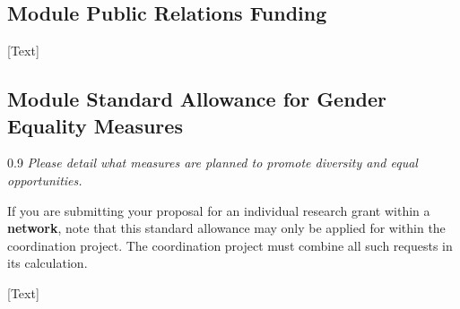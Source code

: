 \documentclass[a4paper,11pt]{article}
\newenvironment{comment}{\begin{spacing}{0.9}\footnotesize\it}{\end{spacing}}
\begin{document}
\subsection{Module Public Relations Funding}

[Text]

\subsection{Module Standard Allowance for Gender Equality Measures}
\begin{comment}
  Please detail what measures are planned to promote diversity and equal opportunities.

  If you are submitting your proposal for an individual research grant within a \textbf{network}, note that this standard allowance may only be applied for within the coordination project. The coordination project must combine all such requests in its calculation.
\end{comment}

[Text]
\end{document}
